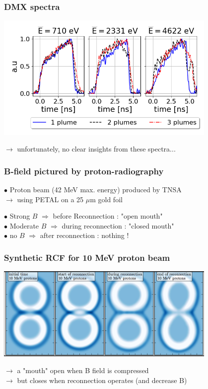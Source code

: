 \documentclass{beamer}
\begin{document}
\begin{frame}
\frametitle{DMX spectra}

\begin{center}
\includegraphics[width=0.8\textwidth]{fig_DMX.png}
\end{center}

$\to$ unfortunately, no clear insights from these spectra...

\end{frame}



\begin{frame}
\frametitle{B-field pictured by proton-radiography}

$\bullet$ Proton beam (42 MeV max. energy) produced by TNSA \\
$\to$ using PETAL on a 25 $\mu$m gold foil



$\bullet$ Strong $B$ $\Rightarrow$ before Reconnection : "open mouth" \\
$\bullet$ Moderate $B$ $\Rightarrow$ during reconnection : "closed mouth" \\
$\bullet$ no $B$ $\Rightarrow$ after reconnection : nothing ! \\

\end{frame}



\begin{frame}
\frametitle{Synthetic RCF for 10 MeV proton beam}

\begin{center}
\includegraphics[width=0.8\textwidth]{rcf2D.png}
\end{center}

$\to$ a "mouth" open when B field is compressed\\
$\to$ but closes when reconnection operates (and decrease B)\\

\end{frame}
\end{document}
